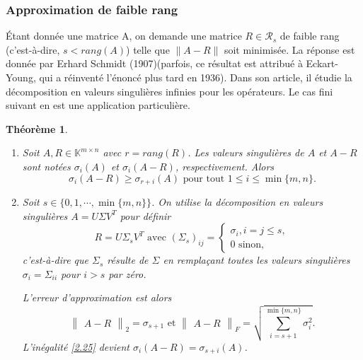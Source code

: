 \documentclass[11pt,a4paper,oneside]{book}
\newtheorem{theo}{Théorème}[chapter]
\def\K{\mathbb K}
\begin{document}
\subsubsection*{Approximation de faible rang}
Étant donnée une matrice A, on demande une matrice $ R\in\mathcal{R}_{s} $ de faible rang (c'est-à-dire, $ s < rang(A) $) telle que $ \parallel
A-R
\parallel $ soit minimisée. La réponse est donnée par Erhard Schmidt (1907)(parfois, ce résultat est attribué à Eckart-Young, qui a réinventé l'énoncé plus tard en 1936). Dans son article, il étudie la décomposition en valeurs singulières infinies pour les opérateurs. Le cas fini suivant en est une application particulière.\newpage
\begin{theo}
\emph{\\}
\begin{enumerate}
\item[(a)] Soit $ A,R\in\K^{m\times n} $ avec $ r=rang(R) $. Les valeurs singulières de $ A $ et $ A-R $ sont notées $ \sigma_{i}(A) $ et $ \sigma_{i}(A-R) $, respectivement. Alors
\begin{equation}\label{2.25}
\sigma_{i}(A-R)\geq \sigma_{r+i}(A) \text{ pour tout } 1\leq i\leq\min\{m,n\}.
\end{equation}
\item[(b)]
Soit $ s\in\{0,1,\cdots ,\min\{m,n\}\} $. On utilise la décomposition en valeurs singulières $ A=U\Sigma V^{T} $ pour définir
\begin{equation}\label{2.26a}
R=U\Sigma_{s}V^{T}\text{ avec }(\Sigma_{s})_{ij}=\begin{cases}
\sigma_{i}, i=j\leq s,\\
0 \text{ sinon},
\end{cases}
\end{equation}
c'est-à-dire que $ \Sigma_{s} $ résulte de $ \Sigma $ en remplaçant toutes les valeurs singulières $ \sigma_{i}=\Sigma_{ii} $ pour $ i> s $ par zéro.

 L'erreur d'approximation est alors
\begin{equation}\label{2.26b}
\begin{Vmatrix}
A-R
\end{Vmatrix}_{2}=\sigma_{s+1} \text{ et }\begin{Vmatrix}
A-R
\end{Vmatrix}_{F}=\sqrt{\sum_{i=s+1}^{\min\{m,n\}}\sigma_{i}^{2}}.
\end{equation}
L'inégalité \eqref{2.25} devient $ \sigma_{i}(A-R)= \sigma_{s+i}(A) $.
\end{enumerate}
\end{theo}
\end{document}
